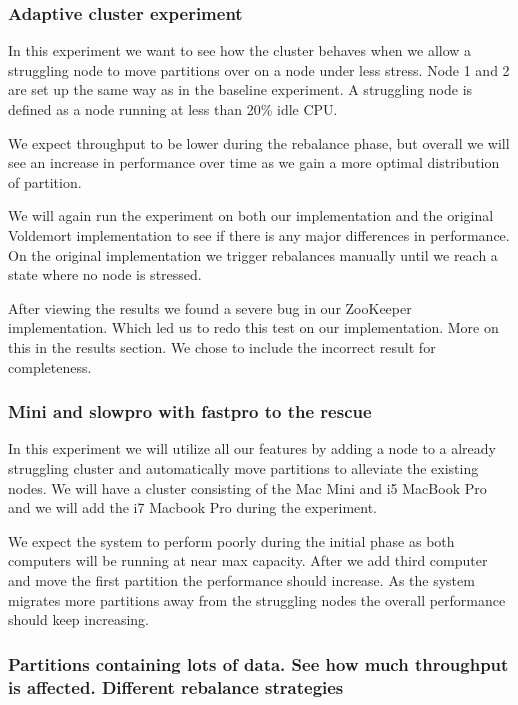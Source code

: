 \subsubsection{Adaptive cluster experiment}
In this experiment we want to see how the cluster behaves when we allow a struggling node to move partitions over on a node under less stress. Node 1 and 2 are set up the same way as in the baseline experiment. A struggling node is defined as a node running at less than 20\% idle CPU.

We expect throughput to be lower during the rebalance phase, but overall we will see an increase in performance over time as we gain a more optimal distribution of partition. 

We will again run the experiment on both our implementation and the original Voldemort implementation to see if there is any major differences in performance. On the original implementation we trigger rebalances manually until we reach a state where no node is stressed. 

After viewing the results we found a severe bug in our ZooKeeper implementation. Which led us to redo this test on our implementation. More on this in the results section. We chose to include the incorrect result for completeness. 


\subsubsection{Mini and slowpro with fastpro to the rescue}
In this experiment we will utilize all our features by adding a node to a already struggling cluster and automatically move partitions to alleviate the existing nodes. We will have a cluster consisting of the Mac Mini and i5 MacBook Pro and we will add the i7 Macbook Pro during the experiment. 

We expect the system to perform poorly during the initial phase as both computers will be running at near max capacity. After we add third computer and move the first partition the performance should increase. As the system migrates more partitions away from the struggling nodes the overall performance should keep increasing. 

\subsubsection{Partitions containing lots of data. See how much throughput is affected. Different rebalance strategies}





